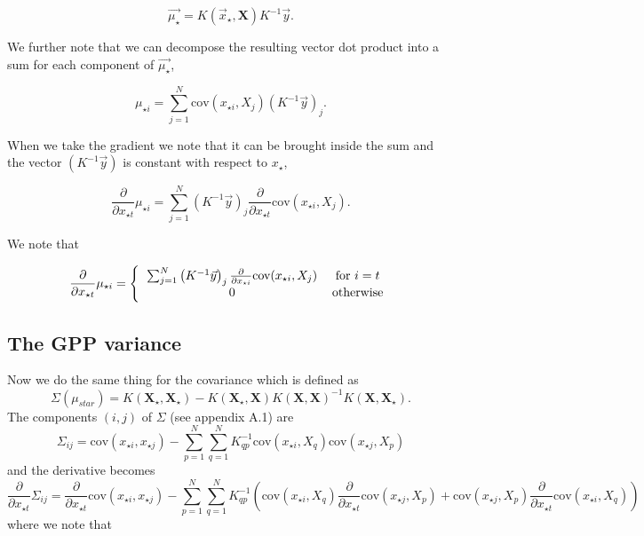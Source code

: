 \documentclass[phd,tocprelim]{cornell}
\begin{document}
\begin{equation}
 \vec{\mu_{\star}} = K(\vec{x}_{\star}, \textbf{X} ) K^{-1} \vec{y}.
\end{equation}

We further note that we can decompose the resulting vector dot product into a sum for each component of $\vec{\mu_{\star}}$,

\begin{equation}
 \mu_{\star {i}} = \sum_{j = 1}^{N} \mbox{cov}(x_{\star i}, X_{j}) \left(K^{-1} \vec{y} \right)_{j}.
\end{equation}

When we take the gradient we note that it can be brought inside the sum and the vector $(K^{-1}\vec{y})$ is constant with respect to $x_{\star}$,

\begin{equation}
 \frac{\partial}{\partial x_{\star t}} \mu_{\star i} = \sum_{j = 1}^{N} \left(K^{-1} \vec{y} \right)_{j} \frac{\partial}{\partial x_{\star t}} \mbox{cov}(x_{\star i}, X_{j}).
\end{equation}

We note that

\begin{equation}
\frac{\partial}{\partial x_{\star t}} \mu_{\star i} = \left\{ \begin{tabular}{cc}
                                                                  $\sum_{j = 1}^{N} \left(K^{-1} \vec{y} \right)_{j} \frac{\partial}{\partial x_{\star i}} \mbox{cov}(x_{\star i}, X_{j})$ & for $i = t$ \\
								  0 & otherwise
                                                                 \end{tabular}\right.
\end{equation}


\subsection{The GPP variance}

Now we do the same thing for the covariance which is defined as
\begin{equation}
 \Sigma(\mu_{star}) = K(\textbf{X$_{\star}$}, \textbf{X$_{\star}$}) - K(\textbf{X$_{\star}$}, \textbf{X}) K(\textbf{X}, \textbf{X})^{-1} K(\textbf{X}, \textbf{X$_{\star}$}).
\end{equation}
The components $(i,j)$ of $\Sigma$ (see appendix A.1) are
\begin{equation}
 \Sigma_{ij} = \mbox{cov}(x_{\star i}, x_{\star j}) - \sum_{p = 1}^{N} \sum_{q = 1}^{N} K^{-1}_{qp} \mbox{cov}(x_{\star i}, X_{q}) \mbox{cov}(x_{\star j}, X_{p})
\end{equation}
and the derivative becomes
\begin{equation}
 \frac{\partial}{\partial x_{\star t}} \Sigma_{ij} = \frac{\partial}{\partial x_{\star t}} \mbox{cov}(x_{\star i}, x_{\star j}) - \sum_{p = 1}^{N} \sum_{q = 1}^{N} K^{-1}_{qp} \left( \mbox{cov}(x_{\star i}, X_{q}) \frac{\partial}{\partial x_{\star t}} \mbox{cov}(x_{\star j}, X_{p}) + \mbox{cov}(x_{\star j}, X_{p}) \frac{\partial}{\partial x_{\star t}} \mbox{cov}(x_{\star i}, X_{q}) \right)
\end{equation}
where we note that
\end{document}
